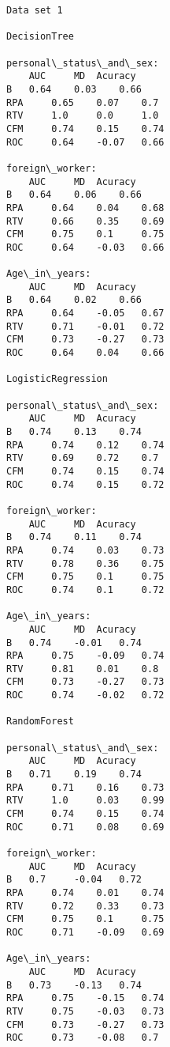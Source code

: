 \documentclass[11pt]{article}
\begin{document}
    \begin{Verbatim}[commandchars=\\\{\}]
Data set 1

DecisionTree

personal\_status\_and\_sex:
	AUC 	MD 	Acuracy
B 	0.64 	0.03 	0.66
RPA 	0.65 	0.07 	0.7
RTV 	1.0 	0.0 	1.0
CFM 	0.74 	0.15 	0.74
ROC 	0.64 	-0.07 	0.66

foreign\_worker:
	AUC 	MD 	Acuracy
B 	0.64 	0.06 	0.66
RPA 	0.64 	0.04 	0.68
RTV 	0.66 	0.35 	0.69
CFM 	0.75 	0.1 	0.75
ROC 	0.64 	-0.03 	0.66

Age\_in\_years:
	AUC 	MD 	Acuracy
B 	0.64 	0.02 	0.66
RPA 	0.64 	-0.05 	0.67
RTV 	0.71 	-0.01 	0.72
CFM 	0.73 	-0.27 	0.73
ROC 	0.64 	0.04 	0.66

LogisticRegression

personal\_status\_and\_sex:
	AUC 	MD 	Acuracy
B 	0.74 	0.13 	0.74
RPA 	0.74 	0.12 	0.74
RTV 	0.69 	0.72 	0.7
CFM 	0.74 	0.15 	0.74
ROC 	0.74 	0.15 	0.72

foreign\_worker:
	AUC 	MD 	Acuracy
B 	0.74 	0.11 	0.74
RPA 	0.74 	0.03 	0.73
RTV 	0.78 	0.36 	0.75
CFM 	0.75 	0.1 	0.75
ROC 	0.74 	0.1 	0.72

Age\_in\_years:
	AUC 	MD 	Acuracy
B 	0.74 	-0.01 	0.74
RPA 	0.75 	-0.09 	0.74
RTV 	0.81 	0.01 	0.8
CFM 	0.73 	-0.27 	0.73
ROC 	0.74 	-0.02 	0.72

RandomForest

personal\_status\_and\_sex:
	AUC 	MD 	Acuracy
B 	0.71 	0.19 	0.74
RPA 	0.71 	0.16 	0.73
RTV 	1.0 	0.03 	0.99
CFM 	0.74 	0.15 	0.74
ROC 	0.71 	0.08 	0.69

foreign\_worker:
	AUC 	MD 	Acuracy
B 	0.7 	-0.04 	0.72
RPA 	0.74 	0.01 	0.74
RTV 	0.72 	0.33 	0.73
CFM 	0.75 	0.1 	0.75
ROC 	0.71 	-0.09 	0.69

Age\_in\_years:
	AUC 	MD 	Acuracy
B 	0.73 	-0.13 	0.74
RPA 	0.75 	-0.15 	0.74
RTV 	0.75 	-0.03 	0.73
CFM 	0.73 	-0.27 	0.73
ROC 	0.73 	-0.08 	0.7

    \end{Verbatim}
\end{document}
